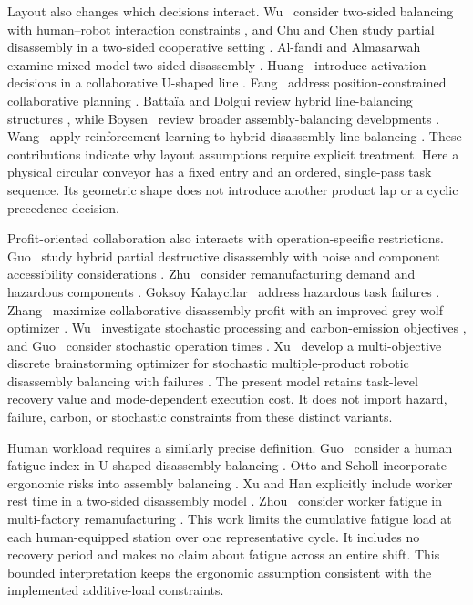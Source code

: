 Layout also changes which decisions interact. Wu \etal\ consider two-sided balancing with human--robot interaction constraints \cite{Wu2023}, and Chu and Chen study partial disassembly in a two-sided cooperative setting \cite{Chu2025}. Al-fandi and Almasarwah examine mixed-model two-sided disassembly \cite{Alfandi2025}. Huang \etal\ introduce activation decisions in a collaborative U-shaped line \cite{Huang2025}. Fang \etal\ address position-constrained collaborative planning \cite{Fang2024}. Batta\"ia and Dolgui review hybrid line-balancing structures \cite{Battaia2022}, while Boysen \etal\ review broader assembly-balancing developments \cite{Boysen2022}. Wang \etal\ apply reinforcement learning to hybrid disassembly line balancing \cite{Wang2024RL}. These contributions indicate why layout assumptions require explicit treatment. Here a physical circular conveyor has a fixed entry and an ordered, single-pass task sequence. Its geometric shape does not introduce another product lap or a cyclic precedence decision.

Profit-oriented collaboration also interacts with operation-specific restrictions. Guo \etal\ study hybrid partial destructive disassembly with noise and component accessibility considerations \cite{Guo2024}. Zhu \etal\ consider remanufacturing demand and hazardous components \cite{Zhu2024}. Goksoy Kalaycilar \etal\ address hazardous task failures \cite{GoksoyKalaycilar2024}. Zhang \etal\ maximize collaborative disassembly profit with an improved grey wolf optimizer \cite{Zhang2025}. Wu \etal\ investigate stochastic processing and carbon-emission objectives \cite{Wu2024}, and Guo \etal\ consider stochastic operation times \cite{Guo2024a}. Xu \etal\ develop a multi-objective discrete brainstorming optimizer for stochastic multiple-product robotic disassembly balancing with failures \cite{Xu2023Failure}. The present model retains task-level recovery value and mode-dependent execution cost. It does not import hazard, failure, carbon, or stochastic constraints from these distinct variants.

Human workload requires a similarly precise definition. Guo \etal\ consider a human fatigue index in U-shaped disassembly balancing \cite{Guo2023}. Otto and Scholl incorporate ergonomic risks into assembly balancing \cite{Otto2011}. Xu and Han explicitly include worker rest time in a two-sided disassembly model \cite{Xu2024}. Zhou \etal\ consider worker fatigue in multi-factory remanufacturing \cite{Zhou2025}. This work limits the cumulative fatigue load at each human-equipped station over one representative cycle. It includes no recovery period and makes no claim about fatigue across an entire shift. This bounded interpretation keeps the ergonomic assumption consistent with the implemented additive-load constraints.

